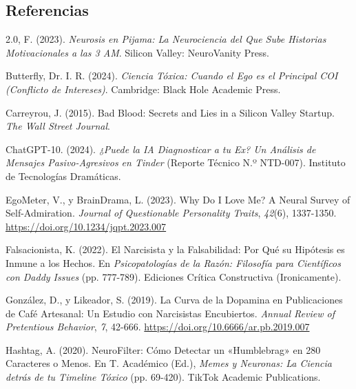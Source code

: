 \documentclass[
  10pt]{article}
\newlength{\cslhangindent}
\newenvironment{CSLReferences}[2] %
 {\begin{list}{}{%
  \setlength{\itemindent}{0pt}
  \setlength{\leftmargin}{0pt}
  \setlength{\parsep}{0pt}
  \ifodd #1
   \setlength{\leftmargin}{\cslhangindent}
   \setlength{\itemindent}{-1\cslhangindent}
  \fi
  \setlength{\itemsep}{#2\baselineskip}}}
 {\end{list}}
\begin{document}
\subsection*{Referencias}\label{referencias}

\label{refs}
\begin{CSLReferences}{1}{0}
2.0, F. (2023). \emph{Neurosis en Pijama: La Neurociencia del Que Sube
Historias Motivacionales a las 3 AM}. Silicon Valley: NeuroVanity Press.

Butterfly, Dr. I. R. (2024). \emph{Ciencia Tóxica: Cuando el Ego es el
Principal {COI} (Conflicto de Intereses)}. Cambridge: Black Hole
Academic Press.

Carreyrou, J. (2015). Bad Blood: Secrets and Lies in a Silicon Valley
Startup. \emph{The Wall Street Journal}.

ChatGPT-10. (2024). \emph{¿Puede la {IA} Diagnosticar a tu Ex? Un
Análisis de Mensajes Pasivo-Agresivos en Tinder} (Reporte Técnico N.º
NTD-007). Instituto de Tecnologías Dramáticas.

EgoMeter, V., y BrainDrama, L. (2023). Why Do I Love Me? A Neural Survey
of Self-Admiration. \emph{Journal of Questionable Personality Traits},
\emph{42}(6), 1337-1350. \url{https://doi.org/10.1234/jqpt.2023.007}

Falsacionista, K. (2022). El Narcisista y la Falsabilidad: Por Qué su
Hipótesis es Inmune a los Hechos. En \emph{Psicopatologías de la Razón:
Filosofía para Científicos con Daddy Issues} (pp. 777-789). Ediciones
Crítica Constructiva (Ironicamente).

González, D., y Likeador, S. (2019). La Curva de la Dopamina en
Publicaciones de Café Artesanal: Un Estudio con Narcisistas Encubiertos.
\emph{Annual Review of Pretentious Behavior}, \emph{7}, 42-666.
\url{https://doi.org/10.6666/ar.pb.2019.007}

Hashtag, A. (2020). NeuroFilter: Cómo Detectar un {{«Humblebrag»}} en
280 Caracteres o Menos. En T. Académico (Ed.), \emph{Memes y Neuronas:
La Ciencia detrás de tu Timeline Tóxico} (pp. 69-420). TikTok Academic
Publications.


\end{CSLReferences}
\end{document}
